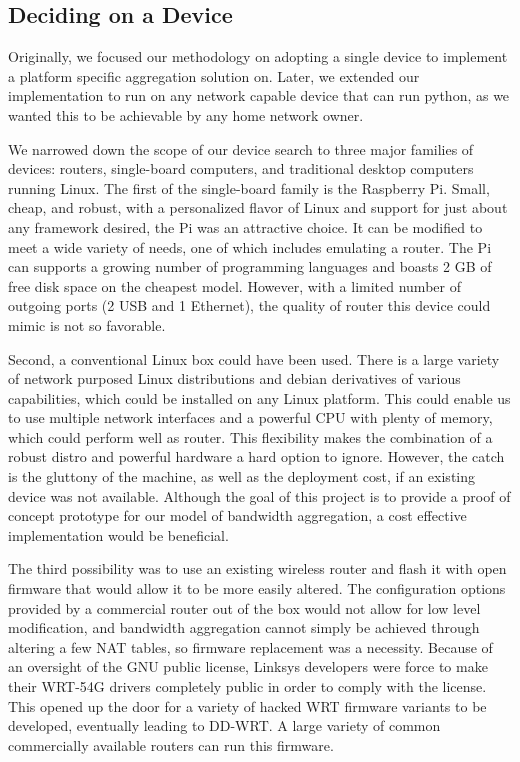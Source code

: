 \documentclass[12pt]{article}
\begin{document}
	\subsection{Deciding on a Device}
		
		Originally, we focused our methodology on adopting a single device to implement a platform specific aggregation solution on. Later, we extended our implementation to run on any network capable device that can run python, as we wanted this to be achievable by any home network owner.

		We narrowed down the scope of our device search to three major families of devices: routers, single-board computers, and traditional desktop computers running  Linux. The first of the single-board family is the Raspberry Pi. Small, cheap, and robust, with a personalized flavor of Linux and support for just about any framework desired, the Pi was an attractive choice. It can be modified to meet a wide variety of needs, one of which includes emulating a router. The Pi can supports a growing number of programming languages and boasts 2 GB of free disk space on the cheapest model. However, with a limited number of outgoing ports (2 USB and 1 Ethernet), the quality of router this device could mimic is not so favorable.

		Second, a conventional Linux box could have been used. There is a large variety of network purposed Linux distributions and debian derivatives of various capabilities, which could be installed on any Linux platform. This could enable us to use multiple network interfaces and a powerful CPU with plenty of memory, which could perform well as router. This flexibility makes the combination of a robust distro and powerful hardware a hard option to ignore. However, the catch is the gluttony of the machine, as well as the deployment cost, if an existing device was not available. Although the goal of this project is to provide a proof of concept prototype for our model of bandwidth aggregation, a cost effective implementation would be beneficial. 

		The third possibility was to use an existing wireless router and flash it with open firmware that would allow it to be more easily altered. The configuration options provided by a commercial router out of the box would not allow for low level modification, and bandwidth aggregation cannot simply be achieved through altering a few NAT tables, so firmware replacement was a necessity. Because of an oversight of the GNU public license, Linksys developers were force to make their WRT-54G drivers completely public in order to comply with the license. This opened up the door for a variety of hacked WRT firmware variants to be developed, eventually leading to DD-WRT. A large variety of common commercially available routers can run this firmware.
\end{document}
